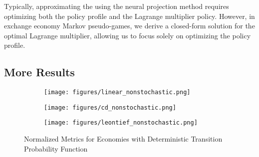 Typically, approximating the \MPGNE{} using the neural projection method requires optimizing both the policy profile and the Lagrange multiplier policy. However, in exchange economy Markov pseudo-games, we derive a closed-form solution for the optimal Lagrange multiplier, allowing us to focus solely on optimizing the policy profile. 
\subsection{More Results}


\begin{figure}
    \begin{subfigure}{\textwidth}
        \centering
        \texttt{[image: figures/linear\_nonstochastic.png]}
        \label{fig:linear_nonstochastic}
    \end{subfigure}
    
    
    \begin{subfigure}{\textwidth}
        \centering
        \texttt{[image: figures/cd\_nonstochastic.png]}
        \label{fig:cd_nonstochastic}
    \end{subfigure}
    
    
    \begin{subfigure}{\textwidth}
        \centering
        \texttt{[image: figures/leontief\_nonstochastic.png]}
        \label{fig:leontief_nonstochastic}
    \end{subfigure}
    \caption{Normalized Metrics for Economies with Deterministic Transition Probability Function}
    \label{fig:nonstochastic}
\end{figure}
